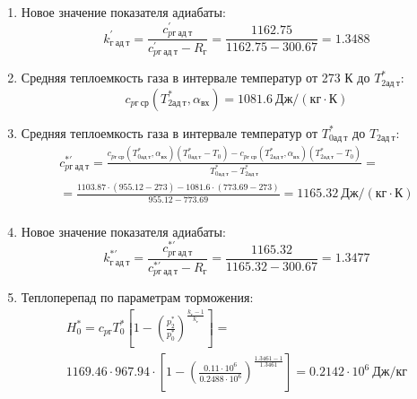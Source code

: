 \documentclass[a4paper,12pt]{article}
\begin{document}
\begin{enumerate}
        \item Новое значение показателя адиабаты:
        \[
            k_{г\ ад\ т}^\prime = \frac{c_{pг\ ад\ т}^\prime}{c_{pг\ ад\ т}^\prime - R_г} =
                \frac{
                    1162.75
                }{
                    1162.75 - 300.67
                }
            = 1.3488
        \]

        \item Средняя теплоемкость газа в интервале температур от 273 К до $T_{2ад\ т}^*$:
        \[
            c_{pг\ ср} (T_{2ад\ т}^*, \alpha_{вх}) =
            1081.6 \ Дж/(кг \cdot К)
        \]

        \item Средняя теплоемкость газа в интервале температур от $T_{0ад\ т}^*$ до $T_{2ад\ т}$:
        \begin{gather*}
            c_{pг\ ад\ т}^{*\prime} = \frac{
		        c_{pг\ ср}(T_{0ад\ т}^*, \alpha_{вх}) (T_{0ад\ т}^* - T_0) - c_{pг\ ср}(T_{2ад\ т}^*, \alpha_{вх}) (T_{2ад\ т}^* - T_0)
		    }{
		        T_{0ад\ т}^* - T_{2ад\ т}^*} =\\
            =\frac{
		        1103.87 \cdot
                (955.12 - 273) -
		        1081.6 \cdot
                (773.69 - 273)
		    }{
		        955.12 - 773.69} =
		    1165.32 \ Дж / (кг \cdot К)\\
        \end{gather*}

        \item Новое значение показателя адиабаты:
        \[
            k_{г\ ад\ т}^{*\prime} = \frac{c_{pг\ ад\ т}^{*\prime}}{c_{pг\ ад\ т}^{*\prime} - R_г} =
                \frac{
                    1165.32
                }{
                    1165.32 - 300.67
                }
            = 1.3477
        \]

        \item Теплоперепад по параметрам торможения:
        \begin{gather*}
            H_0^* = c_{pг} T_0^* \left[
                        1 - \left(
                                \frac{p_2^*}{p_0^*}
                            \right) ^
                        \frac{k_г - 1}{k_г}
                    \right] =\\
            1169.46 \cdot 967.94 \cdot
                    \left[
                        1 - \left(
                                \frac{
                                    0.11 \cdot 10^6
                                }{
                                    0.2488 \cdot 10^6
                                }
                            \right) ^
                        \frac{1.3461 - 1}{1.3461}
                    \right]
            = 0.2142 \cdot 10^6 \ Дж/кг\\
        \end{gather*}


\end{enumerate}
\end{document}
